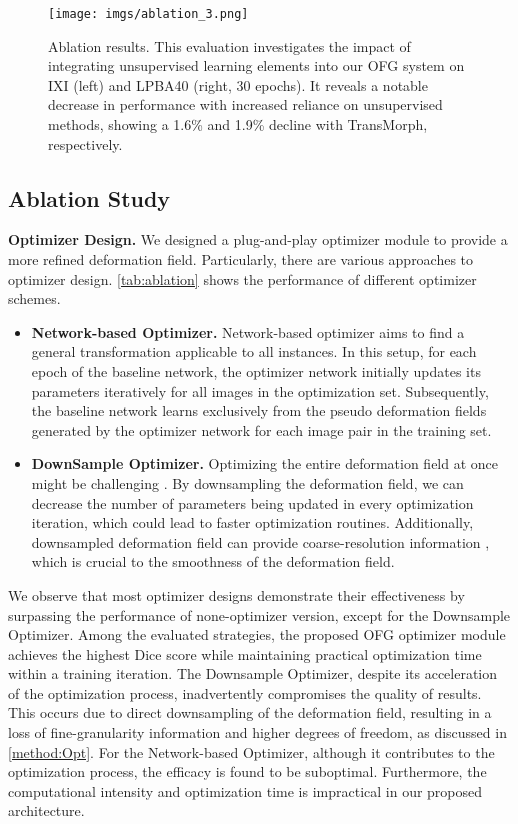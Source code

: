 \documentclass[10pt,twocolumn,letterpaper]{article}
\begin{document}
\begin{figure}[t]
    \begin{center}
       \texttt{[image: imgs/ablation\_3.png]}
    \end{center}
    \caption{Ablation results. This evaluation investigates the impact of integrating unsupervised learning elements into our OFG system on IXI (left) and LPBA40 (right, 30 epochs). It reveals a notable decrease in performance with increased reliance on unsupervised methods, showing a 1.6\% and 1.9\% decline with TransMorph, respectively.}
    \label{fig:mix}
\end{figure}


\subsection{Ablation Study}
\label{sec:ablation_study}
\textbf{Optimizer Design.} We designed a plug-and-play optimizer module to provide a more refined deformation field. Particularly, there are various approaches to optimizer design. \cref{tab:ablation} shows the performance of different optimizer schemes. 
\begin{itemize}
    \item \textbf{Network-based Optimizer.} Network-based optimizer aims to find a general transformation applicable to all instances. In this setup, for each epoch of the baseline network, the optimizer network initially updates its parameters iteratively for all images in the optimization set. Subsequently, the baseline network learns exclusively from the pseudo deformation fields generated by the optimizer network for each image pair in the training set. 
    \item \textbf{DownSample Optimizer.} Optimizing the entire deformation field at once might be challenging \cite{han2022diff}. By downsampling the deformation field, we can decrease the number of parameters being updated in every optimization iteration, which could lead to faster optimization routines. Additionally, downsampled deformation field can provide coarse-resolution information \cite{mok2020large}, which is crucial to the smoothness of the deformation field.
\end{itemize}
We observe that most optimizer designs demonstrate their effectiveness by surpassing the performance of none-optimizer version, except for the Downsample Optimizer. 
Among the evaluated strategies, the proposed OFG optimizer module achieves the highest Dice score while maintaining practical optimization time within a training iteration.
The Downsample Optimizer, despite its acceleration of the optimization process, inadvertently compromises the quality of results. This occurs due to direct downsampling of the deformation field, resulting in a loss of fine-granularity information and higher degrees of freedom, as discussed in \cref{method:Opt}. 
For the Network-based Optimizer, although it contributes to the optimization process, the efficacy is found to be suboptimal. Furthermore, the computational intensity and optimization time is impractical in our proposed architecture. 
\end{document}
